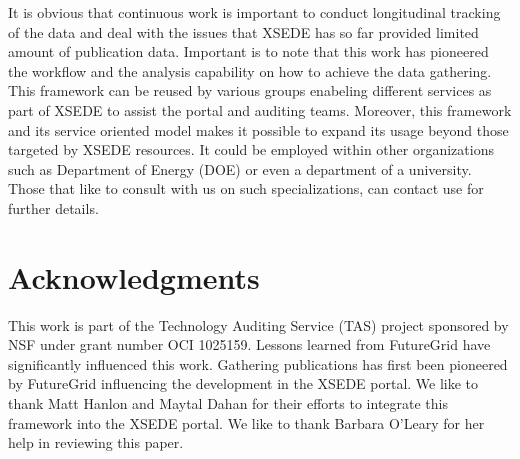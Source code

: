 \documentclass{sig-alternate}
\begin{document}
It is obvious that continuous work is important to conduct longitudinal tracking of the data and deal with the issues that XSEDE has so far provided limited amount of publication data. Important is to note that this work has pioneered the workflow and the analysis capability on how to achieve the data gathering. This framework can be reused by various groups enabeling different services as part of XSEDE to assist the portal and auditing teams. Moreover, this framework and its service oriented model makes it possible to expand its usage beyond those targeted by XSEDE resources. It could be employed within other organizations such as Department of Energy (DOE) or even a department of a university. Those that like to consult with us on such specializations, can contact use for further details.


\section{Acknowledgments}

 
This work is part of the Technology Auditing Service (TAS) project sponsored by NSF under grant number OCI 1025159. Lessons learned from FutureGrid have significantly influenced this work. Gathering publications has first been pioneered by FutureGrid influencing the development in the XSEDE portal. We like to thank Matt Hanlon and Maytal Dahan for their efforts to integrate this framework into the XSEDE portal. We like to thank Barbara O'Leary for her help in reviewing this paper.
 
%
%
 
 

\end{document}
